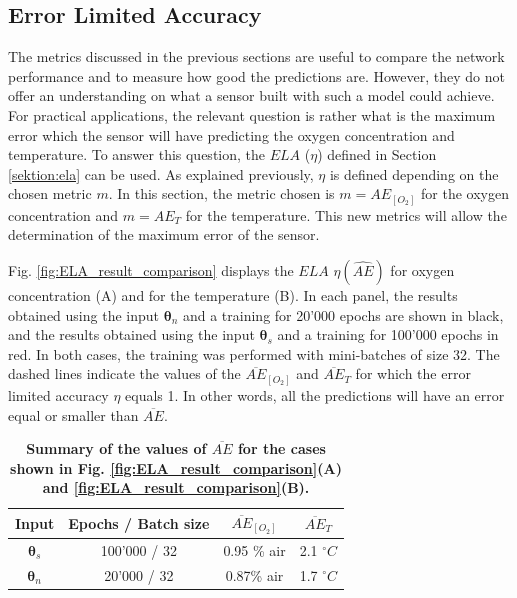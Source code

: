 \documentclass[sensors,article,submit,moreauthors,pdftex,10pt,a4paper]{Definitions/mdpi}
\begin{document}
\subsection{Error Limited Accuracy}

The metrics discussed in the previous sections are useful to compare the network performance and to measure how good the predictions are. However, they do not offer an understanding on what a sensor built with such a model could achieve. For practical applications, the relevant question is rather what is the maximum error which the sensor will have predicting the oxygen concentration and temperature. To answer this question, the $ELA$ ($\eta$) defined in Section \ref{sektion:ela} can be used. As explained previously, $\eta$ is defined depending on the chosen metric $m$. In this section, the metric chosen is $m=AE_{[O_2]}$ for the oxygen concentration and $m=AE_{T}$ for the temperature. This new metrics will allow the determination of the maximum error of the sensor. 

Fig. \ref{fig:ELA_result_comparison} displays the $ELA$ $\eta(\widehat {AE})$ for oxygen concentration (A) and for the temperature (B). In each panel, the results obtained using the input ${\pmb \theta}_n$ and a training for 20'000 epochs are shown in black, and the results obtained using the input ${\pmb \theta}_s$ and a training for 100'000 epochs in red. In both cases, the training was performed with mini-batches of size 32.
The dashed lines indicate the values of the $\overline{AE}_{[O_2]}$ and $\overline{AE}_{T}$ for which the error limited accuracy $\eta$ equals 1. In other words, all the predictions will have an error equal or smaller than $\overline{AE}$.

\begin{table}[t!]
\centering
\caption {\bf Summary of the values of $\overline{AE}$ for the cases shown in Fig. \ref{fig:ELA_result_comparison}(A) and \ref{fig:ELA_result_comparison}(B).}
\begin{tabular}{ cccc}
\smallskip 
 Input & Epochs / Batch size & $\overline{AE}_{[O_2]}$ & $\overline{AE}_{T}$  \\ 
 \hline
${\pmb \theta}_s$ & 100'000 / 32 & 0.95 \% air & 2.1 $^\circ C$\\ 
${\pmb \theta}_n $ & 20'000 / 32 & 0.87\% air & 1.7 $^\circ C$\\ 
\end{tabular}
\label{table:ela}
\end{table}
\end{document}
